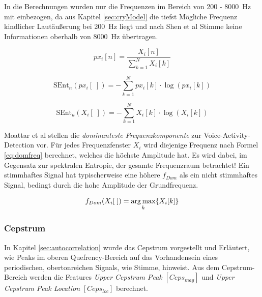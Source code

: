 In die Berechnungen wurden nur die Frequenzen im Bereich von 200 - \SI{8000}{\hertz} mit einbezogen, da aus Kapitel \ref{sec:cryModel} die tiefst Mögliche Frequenz kindlicher Lautäußerung bei \SI{200}{\hertz} liegt und nach Shen et al \cite{vad_entropie02} Stimme keine Informationen oberhalb von \SI{8000}{\hertz} übertragen.

\begin{equation}
px_i[n] = \frac{X_i[n]}{\sum_{k=1}^{N} X_i[k]}
\label{eq:norm_spek}
\end{equation}

\begin{equation}
\text{SEnt}_n(px_i[\;]) = -\sum_{k=1}^{N}px_i[k] \cdot\log(px_i[k])
\label{eq:norm_se}
\end{equation}

\begin{equation}
\text{SEnt}_u(X_i[\;]) = -\sum_{k=1}^{N}X_i[k] \cdot\log(X_i[k])
\label{eq:unnnorm_se}
\end{equation}

Moattar et al \cite[S. 2550]{vad_Easy} stellen die \emph{dominanteste Frequenzkomponente} zur Voice-Activity-Detection vor. Für jedes Frequenzfenster $X_i$ wird diejenige Frequenz nach Formel \ref{eq:domfreq} berechnet, welches die höchste Amplitude hat. Es wird dabei, im Gegensatz zur spektralen Entropie, der gesamte Frequenzraum betrachtet! Ein stimmhaftes Signal hat typischerweise eine höhere $f_{Dom}$ als ein nicht stimmhaftes Signal, bedingt durch die hohe Amplitude der Grundfrequenz.

\begin{equation}
f_{Dom}(X_i[\;]) = \operatorname*{arg\,max}_k\{X_i[k]\}
\label{eq:domfreq}
\end{equation}



\subsubsection{Cepstrum}

In Kapitel \ref{sec:autocorrelation} wurde das Cepstrum vorgestellt und Erläutert, wie Peaks im oberen Quefrency-Bereich auf das Vorhandensein eines periodischen, obertonreichen Signals, wie Stimme, hinweist. Aus dem Cepstrum-Bereich werden die Features \emph{Upper Cepstrum Peak} $[ Ceps_{mag} ]$ und \emph{Upper Cepstrum Peak Location} $[ Ceps_{loc} ]$ berechnet.


